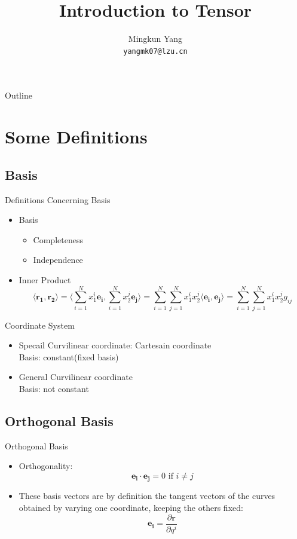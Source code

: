\documentclass{beamer}
\title{Introduction to Tensor}
\author{Mingkun Yang \\
		\texttt{yangmk07@lzu.cn}}
\institute{
School of Physics\\
Lanzhou University\\
}
\date{}
\begin{document}
\begin{frame}
	\titlepage
\end{frame}

\begin{frame}{Outline}
	\tableofcontents[pausesections]
\end{frame}

\section{Some Definitions}
\subsection{Basis}
\begin{frame}{Definitions Concerning Basis}
	\begin{itemize}
		\item
			Basis
			\pause
			\begin{itemize}
				\item
					Completeness
				\item
					Independence
			\end{itemize}
			\pause
		\item
			Inner Product
			\[ \langle \mathbf{r_1}, \mathbf{r_2} \rangle = \langle \sum_{i=1}^N x_1^i \mathbf{e_i}, \sum_{i=1}^N x_2^j \mathbf{e_j} \rangle =  
			\sum_{i=1}^N \sum_{j=1}^N x_1^i x_2^j \langle \mathbf{e_i}, \mathbf{e_j} \rangle = \sum_{i=1}^N \sum_{j=1}^N x_1^i x_2^j g_{ij} \]
	\end{itemize}
\end{frame}

\begin{frame}{Coordinate System}
	\pause
	\begin{itemize}
		\item
			Specail Curvilinear coordinate: Cartesain coordinate \\
			Basis: constant(fixed basis)
		\item
			General Curvilinear coordinate \\
			Basis: not constant
	\end{itemize}
\end{frame}

\subsection{Orthogonal Basis}
\begin{frame}{Orthogonal Basis}
	\begin{itemize}
		\item
			Orthogonality:
			\[ \mathbf{e_i} \cdot \mathbf{e_j} = 0 \text{  if  } i \neq j \]

			\pause
		\item
			These basis vectors are by definition the tangent vectors of the curves obtained by varying one coordinate, keeping the others fixed:
			\[ \mathbf{e_i} = \frac{\partial{\mathbf{r}}}{\partial{q^i}} \]
	\end{itemize}
\end{frame}
\end{document}
